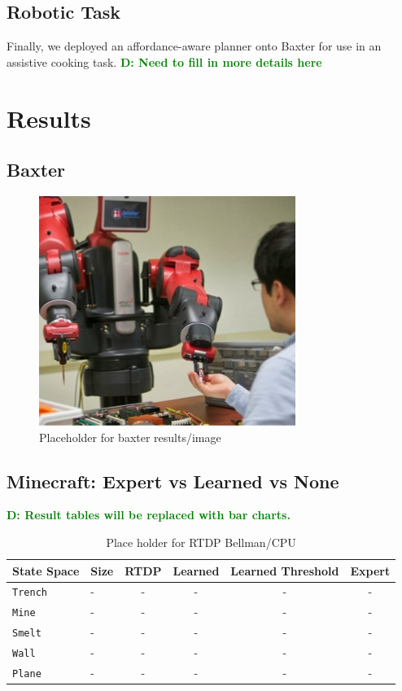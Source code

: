 \documentclass[conference]{IEEEtran}
\newcommand{\dnote}[1]{\textcolor{Green}{\textbf{D: #1}}}
\begin{document}
\subsection{Robotic Task}
Finally, we deployed an affordance-aware planner onto Baxter for use
in an assistive cooking task. \dnote{Need to fill in more details here}

\section{Results}
\label{sec:results}

\subsection{Baxter}

\begin{figure}[H]
\centering
\includegraphics[scale=0.195]{figures/baxter_temp.jpg}%
  \caption{Placeholder for baxter results/image}
  \label{fig:baxter_results}
\end{figure}

\subsection{Minecraft: Expert vs Learned vs None}

\dnote{Result tables will be replaced with bar charts.}

\begin{table}[H]
\centering
\begin{tabular}{ l  l || c c c c }
  State Space 		&	Size 	&	RTDP 	& Learned 	& Learned Threshold & Expert 	\\ \hline
  \texttt{Trench}  	& 	-	&	-	&	-		&	-	&	-	\\
  \texttt{Mine}  		& 	-	&	-	&	-		&	-   	&	-	\\
  \texttt{Smelt}  		& 	-	&	-	&	-		&	-	&	-	\\
  \texttt{Wall}  		& 	-	&	-	&	-		&	-	&	-	\\
  \texttt{Plane}  		& 	-	&	-	&	-		&	- 	&	-	\\
\end{tabular}
\caption{Place holder for RTDP Bellman/CPU}
\label{table:minecraft_results_bellman}
\end{table}
\end{document}
